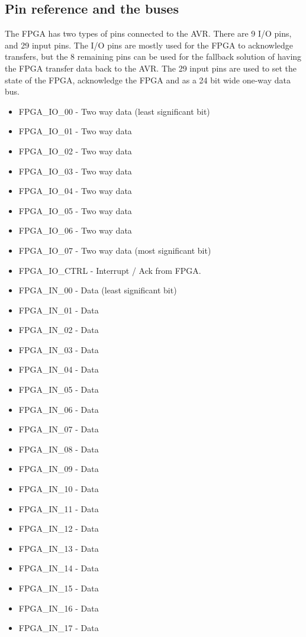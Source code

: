 \subsection {Pin reference and the buses}
The FPGA has two types of pins connected to the AVR. There are 9 I/O pins, and 29 input pins. The I/O pins are mostly used for the FPGA to acknowledge transfers, but the 8 remaining pins can be used for the fallback solution of having the FPGA transfer data back to the AVR. The 29 input pins are used to set the state of the FPGA, acknowledge the FPGA and as a 24 bit wide one-way data bus.

\begin{itemize}
\item FPGA\_IO\_00 - Two way data (least significant bit)
\item FPGA\_IO\_01 - Two way data
\item FPGA\_IO\_02 - Two way data
\item FPGA\_IO\_03 - Two way data
\item FPGA\_IO\_04 - Two way data
\item FPGA\_IO\_05 - Two way data
\item FPGA\_IO\_06 - Two way data
\item FPGA\_IO\_07 - Two way data (most significant bit)
\item FPGA\_IO\_CTRL - Interrupt / Ack from FPGA.
\item FPGA\_IN\_00 - Data (least significant bit)
\item FPGA\_IN\_01 - Data
\item FPGA\_IN\_02 - Data
\item FPGA\_IN\_03 - Data
\item FPGA\_IN\_04 - Data
\item FPGA\_IN\_05 - Data
\item FPGA\_IN\_06 - Data
\item FPGA\_IN\_07 - Data
\item FPGA\_IN\_08 - Data
\item FPGA\_IN\_09 - Data
\item FPGA\_IN\_10 - Data
\item FPGA\_IN\_11 - Data
\item FPGA\_IN\_12 - Data
\item FPGA\_IN\_13 - Data
\item FPGA\_IN\_14 - Data
\item FPGA\_IN\_15 - Data
\item FPGA\_IN\_16 - Data
\item FPGA\_IN\_17 - Data

\end{itemize}
